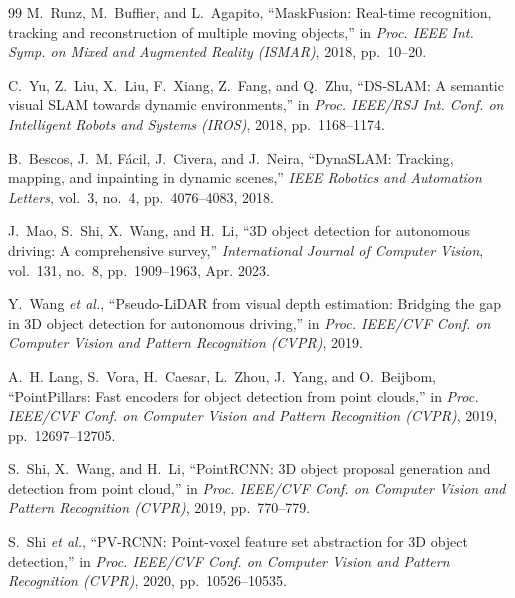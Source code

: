 \documentclass[letterpaper, 10 pt, conference]{IEEEtran}  %
\begin{document}
\begin{thebibliography}{99}
M.~Runz, M.~Buffier, and L.~Agapito,
``MaskFusion: Real-time recognition, tracking and reconstruction of multiple moving objects,''
in \emph{Proc. IEEE Int. Symp. on Mixed and Augmented Reality (ISMAR)}, 2018, pp.~10--20.

C.~Yu, Z.~Liu, X.~Liu, F.~Xiang, Z.~Fang, and Q.~Zhu,
``DS-SLAM: A semantic visual SLAM towards dynamic environments,''
in \emph{Proc. IEEE/RSJ Int. Conf. on Intelligent Robots and Systems (IROS)}, 2018, pp.~1168--1174.

B.~Bescos, J.~M. Fácil, J.~Civera, and J.~Neira,
``DynaSLAM: Tracking, mapping, and inpainting in dynamic scenes,''
\emph{IEEE Robotics and Automation Letters}, vol.~3, no.~4, pp.~4076--4083, 2018.

J.~Mao, S.~Shi, X.~Wang, and H.~Li,
``3D object detection for autonomous driving: A comprehensive survey,''
\emph{International Journal of Computer Vision}, vol.~131, no.~8, pp.~1909--1963, Apr. 2023.

Y.~Wang \emph{et al.},
``Pseudo-LiDAR from visual depth estimation: Bridging the gap in 3D object detection for autonomous driving,''
in \emph{Proc. IEEE/CVF Conf. on Computer Vision and Pattern Recognition (CVPR)}, 2019.

A.~H. Lang, S.~Vora, H.~Caesar, L.~Zhou, J.~Yang, and O.~Beijbom,
``PointPillars: Fast encoders for object detection from point clouds,''
in \emph{Proc. IEEE/CVF Conf. on Computer Vision and Pattern Recognition (CVPR)},
2019, pp.~12697--12705.

S.~Shi, X.~Wang, and H.~Li,
``PointRCNN: 3D object proposal generation and detection from point cloud,''
in \emph{Proc. IEEE/CVF Conf. on Computer Vision and Pattern Recognition (CVPR)},
2019, pp.~770--779.

S.~Shi \emph{et al.},
``PV-RCNN: Point-voxel feature set abstraction for 3D object detection,''
in \emph{Proc. IEEE/CVF Conf. on Computer Vision and Pattern Recognition (CVPR)},
2020, pp.~10526--10535.






\end{thebibliography}
\end{document}
